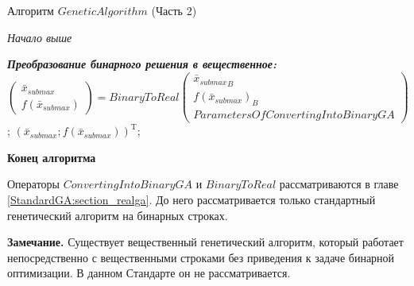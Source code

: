 \begin{algorithm}
\end{algorithm}

\begin{algorithm}
\caption{Алгоритм $ GeneticAlgorithm $ (Часть 2)}
\begin{algorithmic}
\State \textit{Начало выше}

\BeginBlock \textbf{\textit{Преобразование бинарного решения в вещественное:}}
\State $ \left( \begin{array}{c} \bar{x}_{submax} \\ f\left( \bar{x}_{submax}\right)\end{array}\right)=BinaryToReal \left( \begin{array}{c} \bar{x}{{}_{submax}}_B \\ {f\left( \bar{x}_{submax}\right)}_B \\ ParametersOfConvertingIntoBinaryGA \end{array}\right)  $;
\State \Return ${\left( \bar{x}_{submax}; f\left( \bar{x}_{submax}\right) \right)}^ $;
\EndBlock


\State \textbf{Конец алгоритма}
\end{algorithmic}
\end{algorithm}

Операторы $ ConvertingIntoBinaryGA $ и $ BinaryToReal $ рассматриваются в главе \ref{StandardGA:section_realga}. До него рассматривается только стандартный генетический алгоритм на бинарных строках.

\textbf{Замечание.} Существует вещественный генетический алгоритм, который работает непосредственно с вещественными строками без приведения к задаче бинарной оптимизации. В данном Стандарте он не рассматривается.


\clearpage